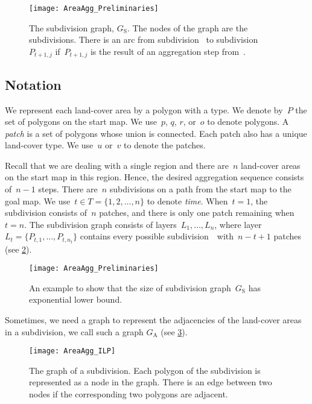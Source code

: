 \begin{figure}[tb]
\centering
\texttt{[image: AreaAgg\_Preliminaries]}
\caption{The subdivision graph, $G_\mathrm{S}$. 
	The nodes of the graph are the subdivisions. 
	There is an arc	from subdivision~\Pnode 
	to subdivision~${P}_{t+1,j}$ 
	if~${P}_{t+1,j}$ is the result of 
	an aggregation step from~\Pnode.}
\label{fig:AreaAgg_SubdivisionName}
\end{figure}


\subsection{Notation}
\label{sec:AreaAgg_Notation}

We represent each land-cover area by a polygon with a type.
We denote by~$P$ the set of polygons on the start map.
We use~$p$, $q$, $r$, or~$o$ to denote polygons.
A \emph{patch} is a set of polygons whose union is connected. 
Each patch also has a unique land-cover type.
We use~$u$ or~$v$ to denote the patches.

Recall that we are dealing with a single region and 
there are~$n$ land-cover areas on the start map in this region. 
Hence, the desired aggregation sequence consists of~$n-1$ steps. 
There are~$n$ subdivisions on a path 
from the start map to the goal map. 
We use~$t \in T =\{1,2,\dots,n\}$ to denote \emph{time}. 
When~$t=1$, the subdivision consists of~$n$ patches, 
and there is only one patch remaining when~$t=n$.
The subdivision graph consists of layers~${L}_1,\dots,{L}_n$, 
where layer~${L}_t=\{{P}_{t,1},\dots,{P}_{t,n_t}\}$
contains every possible subdivision~\Pnode\ with~$n-t+1$ patches 
(see \fig\ref{fig:AreaAgg_ExponentialSize}).


\begin{figure}[tb]
\centering
\texttt{[image: AreaAgg\_Preliminaries]}
\caption{An example to show that 
    the size of subdivision graph~$G_\mathrm{S}$
	has exponential lower bound.}
\label{fig:AreaAgg_ExponentialSize}
\end{figure}

Sometimes, we need a graph to represent the adjacencies of
the land-cover areas in a subdivision,
we call such a graph $G_\mathrm{A}$
(see \fig\ref{fig:AreaAgg_Variables_Graph}). 


\begin{figure}[tb]
\centering
\texttt{[image: AreaAgg\_ILP]}
\caption{The graph of a subdivision.
	Each polygon of the subdivision is represented as a node 
	in the graph.
	There is an edge between two nodes
	if the corresponding two polygons are adjacent.
}
\label{fig:AreaAgg_Variables_Graph}
\end{figure} 





